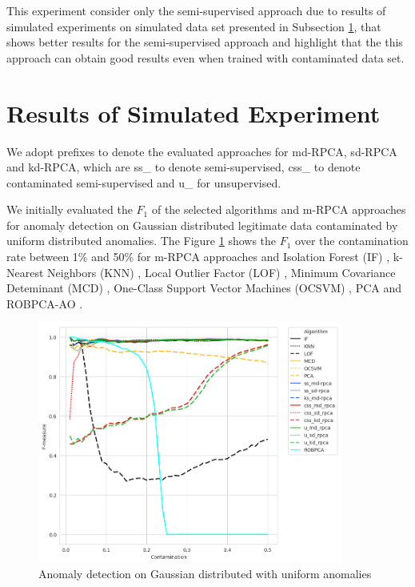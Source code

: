 This experiment consider only the semi-supervised approach due to results of simulated experiments on simulated data set presented in Subsection \ref{sec:4_simulated_result}, that shows better results for the semi-supervised approach and highlight that the this approach can obtain good results even when trained with contaminated data set.


\section{Results of Simulated Experiment}
\label{sec:4_simulated_result}

We adopt prefixes to denote the evaluated approaches for md-RPCA, sd-RPCA and kd-RPCA, which are ss\_ to denote semi-supervised, css\_ to denote contaminated semi-supervised and u\_ for unsupervised.

We initially evaluated the $F_1$ of the selected algorithms and m-RPCA approaches for anomaly detection on Gaussian distributed legitimate data contaminated by uniform distributed anomalies. The Figure \ref{fig:4.10} shows the $F_1$ over the contamination rate between 1\% and 50\% for m-RPCA approaches and Isolation Forest (IF) \cite{liu2008isolation}, k-Nearest Neighbors (KNN) \cite{angiulli2002fast}, Local Outlier Factor (LOF) \cite{breunig2000lof}, Minimum Covariance Deteminant (MCD) \cite{rousseeuw1999fastmcd}, One-Class Support Vector Machines (OCSVM) \cite{scholkopf2001estimating}, PCA \cite{shyu2003novel} and ROBPCA-AO \cite{hubert2009robustskewed}.

\begin{figure}[h!]
	\centering
	\includegraphics[width=10cm]{figs/ch4/gaussian_f1_contamination.png}
	\caption{Anomaly detection on Gaussian distributed with uniform anomalies}
	\label{fig:4.10}
\end{figure}

